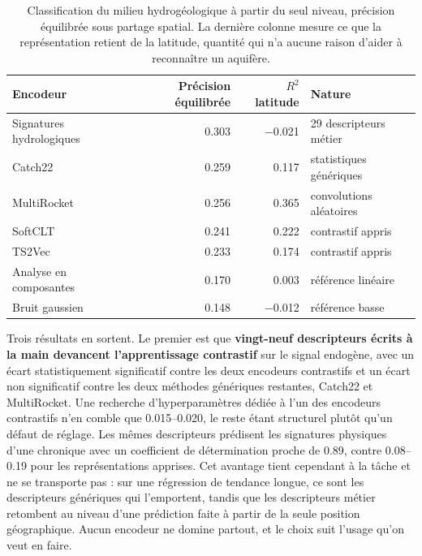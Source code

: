 \begin{table}[H]
\centering
\caption{Classification du milieu hydrogéologique à partir du seul niveau, précision équilibrée
sous partage spatial. La dernière colonne mesure ce que la représentation retient de la
latitude, quantité qui n'a aucune raison d'aider à reconnaître un aquifère.}
\label{tab:banc-plongements}
\begin{tabularx}{\textwidth}{@{}Yrrl@{}}
\toprule
\textbf{Encodeur} & \textbf{Précision équilibrée} & \textbf{$R^2$ latitude} & \textbf{Nature} \\
\midrule
Signatures hydrologiques & \num{0,303} & \num{-0,021} & 29 descripteurs métier \\
Catch22                  & \num{0,259} & \num{0,117}  & statistiques génériques \\
MultiRocket              & \num{0,256} & \num{0,365}  & convolutions aléatoires \\
SoftCLT                  & \num{0,241} & \num{0,222}  & contrastif appris \\
TS2Vec                   & \num{0,233} & \num{0,174}  & contrastif appris \\
Analyse en composantes   & \num{0,170} & \num{0,003}  & référence linéaire \\
Bruit gaussien           & \num{0,148} & \num{-0,012} & référence basse \\
\bottomrule
\end{tabularx}
\end{table}

Trois résultats en sortent. Le premier est que \textbf{vingt-neuf descripteurs écrits à la main
devancent l'apprentissage contrastif} sur le signal endogène, avec un écart statistiquement
significatif contre les deux encodeurs contrastifs et un écart non significatif contre les deux
méthodes génériques restantes, Catch22 et MultiRocket. Une recherche d'hyperparamètres dédiée à
l'un des encodeurs contrastifs n'en comble que \numrange{0,015}{0,020}, le reste étant structurel
plutôt qu'un défaut de réglage. Les mêmes descripteurs prédisent les signatures physiques d'une
chronique avec un coefficient de détermination proche de \num{0,89}, contre
\numrange{0,08}{0,19} pour les représentations apprises. Cet avantage tient cependant à la tâche
et ne se transporte pas : sur une régression de tendance longue, ce sont les descripteurs
génériques qui l'emportent, tandis que les descripteurs métier retombent au niveau d'une
prédiction faite à partir de la seule position géographique. Aucun encodeur ne domine partout,
et le choix suit l'usage qu'on veut en faire.

